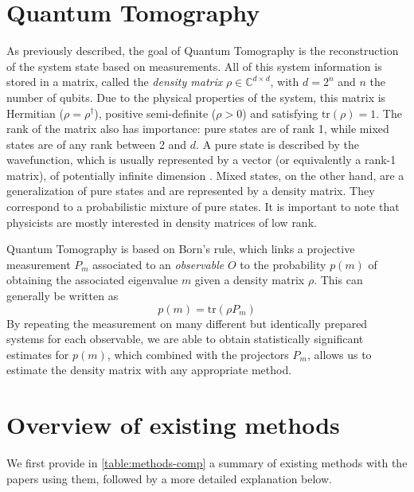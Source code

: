 \documentclass[12pt]{memoir}
\newcommand{\tr}{\text{tr}}
\begin{document}
\section{Quantum Tomography} \label{introduction:quantum-tomography}

As previously described, the goal of Quantum Tomography is the reconstruction of the system state based on measurements. All of this system information is stored in a matrix, called the \textit{density matrix} $\rho \in \mathbb{C}^{d \times d}$, with $d = 2^n$ and $n$ the number of qubits. Due to the physical properties of the system, this matrix is Hermitian ($\rho = \rho^{\dagger}$), positive semi-definite ($\rho > 0$) and satisfying $\tr(\rho) = 1$. The rank of the matrix also has importance: pure states are of rank 1, while mixed states are of any rank between 2 and $d$. A pure state is described by the wavefunction, which is usually represented by a vector (or equivalently a rank-1 matrix), of potentially infinite dimension . Mixed states, on the other hand, are a generalization of pure states and are represented by a density matrix. They correspond to a probabilistic mixture of pure states. It is important to note that physicists are mostly interested in density matrices of low rank.\medbreak

Quantum Tomography is based on Born's rule, which links a projective measurement $P_m$ associated to an \textit{observable} $O$ to the probability $p(m)$ of obtaining the associated eigenvalue $m$ given a density matrix $\rho$. This can generally be written as 
\begin{equation}
    p(m) = \tr(\rho P_m)
\end{equation}
By repeating the measurement on many different but identically prepared systems for each observable, we are able to obtain statistically significant estimates for $p(m)$, which combined with the projectors $P_m$, allows us to estimate the density matrix with any appropriate method.
\section{Overview of existing methods}\label{section:litterature-review}
We first provide in \ref{table:methods-comp} a summary of existing methods with the papers using them, followed by a more detailed explanation below.  
\end{document}
